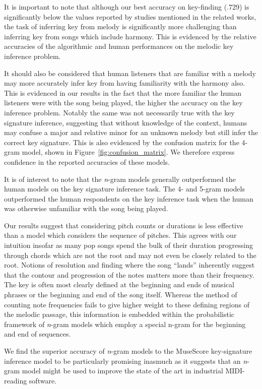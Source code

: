 \documentclass[letterpaper]{article}
\begin{document}
It is important to note that although our best accuracy on key-finding (.729) is significantly below the values reported by studies mentioned in the related works, the task of inferring key from melody is significantly more challenging than inferring key from songs which include harmony. This is evidenced by the relative accuracies of the algorithmic and human performances on the melodic key inference problem. 

It should also be considered that human listeners that are familiar with a melody may more accurately infer key from having familiarity with the harmony also. This is evidenced in our results in the fact that the more familiar the human listeners were with the song being played, the higher the accuracy on the key inference problem. Notably the same was not necessarily true with the key signature inference, suggesting that without knowledge of the context, humans may confuse a major and relative minor for an unknown melody but still infer the correct key signature. This is also evidenced by the confusion matrix for the 4-gram model, shown in Figure~\ref{fig:confusion_matrix}. We therefore express confidence in the reported accuracies of these models.

It is of interest to note that the \emph{n}-gram models generally outperformed the human models on the key signature inference task. The 4- and 5-gram models outperformed the human respondents on the key inference task when the human was otherwise unfamiliar with the song being played. 

Our results suggest that considering pitch counts or durations is less effective than a model which considers the sequence of pitches. This agrees with our intuition insofar as many pop songs spend the bulk of their duration progressing through chords which are not the root and may not even be closely related to the root. Notions of resolution and finding where the song ``lands'' inherently suggest that the contour and progression of the notes matters more than their frequency. The key is often most clearly defined at the beginning and ends of musical phrases or the beginning and end of the song itself. Whereas the method of counting note frequencies fails to give higher weight to these defining regions of the melodic passage, this information is embedded within the probabilistic framework of \emph{n}-gram models which employ a special n-gram for the beginning and end of sequences.

We find the superior accuracy of \emph{n}-gram models to the MuseScore key-signature inference model to be particularly promising inasmuch as it suggests that an \emph{n}-gram model might be used to improve the state of the art in industrial MIDI-reading software.
\end{document}

